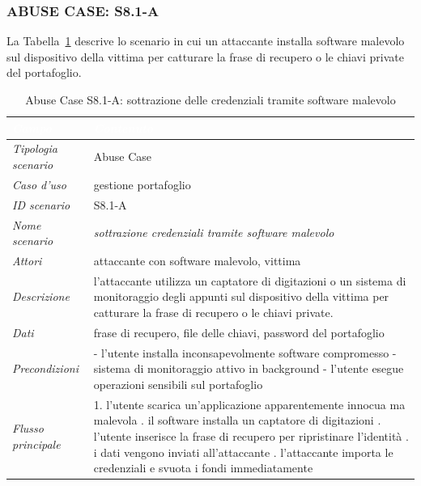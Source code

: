 \subsubsection*{ABUSE CASE: S8.1-A}
La Tabella~\ref{tab:s81a} descrive lo scenario in cui un attaccante installa software malevolo sul dispositivo della vittima per catturare la frase di recupero o le chiavi private del portafoglio.
\begin{longtable}{| >{\columncolor{abuseCol}}p{} | p{} |}
\caption{Abuse Case S8.1-A: sottrazione delle credenziali tramite software malevolo}\label{tab:s81a}\\
\hline
\rowcolor{abuseHeader} \textcolor{white}{\textit{Campo}} & \textcolor{white}{\textit{Contenuto}} \\
\hline
\textit{Tipologia scenario} & Abuse Case \\
\hline
\textit{Caso d'uso} & gestione portafoglio \\
\hline
\textit{ID scenario} & S8.1-A \\
\hline
\textit{Nome scenario} & \textit{sottrazione credenziali tramite software malevolo} \\
\hline
\textit{Attori} & attaccante con software malevolo, vittima \\
\hline
\textit{Descrizione} & l'attaccante utilizza un captatore di digitazioni o un sistema di monitoraggio degli appunti sul dispositivo della vittima per catturare la frase di recupero o le chiavi private. \\
\hline
\textit{Dati} & frase di recupero, file delle chiavi, password del portafoglio \\
\hline
\textit{Precondizioni} & - l'utente installa inconsapevolmente software compromesso \newline - sistema di monitoraggio attivo in background \newline - l'utente esegue operazioni sensibili sul portafoglio \\
\hline
\textit{Flusso principale} & 1. l'utente scarica un'applicazione apparentemente innocua ma malevola \newline 2. il software installa un captatore di digitazioni \newline 3. l'utente inserisce la frase di recupero per ripristinare l'identità \newline 4. i dati vengono inviati all'attaccante \newline 5. l'attaccante importa le credenziali e svuota i fondi immediatamente \\

\end{longtable}
